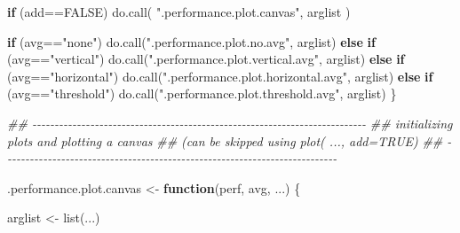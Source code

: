\documentclass[
  letterpaper,
  DIV=11,
  numbers=noendperiod]{scrartcl}
\newenvironment{Shaded}{\begin{snugshade}}{\end{snugshade}}
\newcommand{\ConstantTok}[1]{\textcolor[rgb]{0.56,0.35,0.01}{#1}}
\newcommand{\ControlFlowTok}[1]{\textcolor[rgb]{0.00,0.23,0.31}{\textbf{#1}}}
\newcommand{\DocumentationTok}[1]{\textcolor[rgb]{0.37,0.37,0.37}{\textit{#1}}}
\newcommand{\FunctionTok}[1]{\textcolor[rgb]{0.28,0.35,0.67}{#1}}
\newcommand{\NormalTok}[1]{\textcolor[rgb]{0.00,0.23,0.31}{#1}}
\newcommand{\OtherTok}[1]{\textcolor[rgb]{0.00,0.23,0.31}{#1}}
\newcommand{\SpecialCharTok}[1]{\textcolor[rgb]{0.37,0.37,0.37}{#1}}
\newcommand{\StringTok}[1]{\textcolor[rgb]{0.13,0.47,0.30}{#1}}
\begin{document}
\begin{Shaded}
\begin{Highlighting}[]
      \ControlFlowTok{if}\NormalTok{ (add}\SpecialCharTok{==}\ConstantTok{FALSE}\NormalTok{) }\FunctionTok{do.call}\NormalTok{( }\StringTok{".performance.plot.canvas"}\NormalTok{, arglist )}

      \ControlFlowTok{if}\NormalTok{ (avg}\SpecialCharTok{==}\StringTok{"none"}\NormalTok{) }\FunctionTok{do.call}\NormalTok{(}\StringTok{".performance.plot.no.avg"}\NormalTok{, arglist)  }
      \ControlFlowTok{else} \ControlFlowTok{if}\NormalTok{ (avg}\SpecialCharTok{==}\StringTok{"vertical"}\NormalTok{)}
        \FunctionTok{do.call}\NormalTok{(}\StringTok{".performance.plot.vertical.avg"}\NormalTok{, arglist)}
      \ControlFlowTok{else} \ControlFlowTok{if}\NormalTok{ (avg}\SpecialCharTok{==}\StringTok{"horizontal"}\NormalTok{)}
        \FunctionTok{do.call}\NormalTok{(}\StringTok{".performance.plot.horizontal.avg"}\NormalTok{, arglist)}
      \ControlFlowTok{else} \ControlFlowTok{if}\NormalTok{ (avg}\SpecialCharTok{==}\StringTok{"threshold"}\NormalTok{)}
        \FunctionTok{do.call}\NormalTok{(}\StringTok{".performance.plot.threshold.avg"}\NormalTok{, arglist)}
\NormalTok{  \}}

\DocumentationTok{\#\# {-}{-}{-}{-}{-}{-}{-}{-}{-}{-}{-}{-}{-}{-}{-}{-}{-}{-}{-}{-}{-}{-}{-}{-}{-}{-}{-}{-}{-}{-}{-}{-}{-}{-}{-}{-}{-}{-}{-}{-}{-}{-}{-}{-}{-}{-}{-}{-}{-}{-}{-}{-}{-}{-}{-}{-}{-}{-}{-}{-}{-}{-}{-}{-}{-}{-}{-}{-}{-}{-}{-}{-}{-}{-}{-}}
\DocumentationTok{\#\# initializing plots and plotting a canvas}
\DocumentationTok{\#\# (can be skipped using \textquotesingle{}plot( ..., add=TRUE)\textquotesingle{}}
\DocumentationTok{\#\# {-}{-}{-}{-}{-}{-}{-}{-}{-}{-}{-}{-}{-}{-}{-}{-}{-}{-}{-}{-}{-}{-}{-}{-}{-}{-}{-}{-}{-}{-}{-}{-}{-}{-}{-}{-}{-}{-}{-}{-}{-}{-}{-}{-}{-}{-}{-}{-}{-}{-}{-}{-}{-}{-}{-}{-}{-}{-}{-}{-}{-}{-}{-}{-}{-}{-}{-}{-}{-}{-}{-}{-}{-}{-}{-}}

\NormalTok{.performance.plot.canvas }\OtherTok{\textless{}{-}} \ControlFlowTok{function}\NormalTok{(perf, avg, ...) \{}

\NormalTok{    arglist }\OtherTok{\textless{}{-}} \FunctionTok{list}\NormalTok{(...)}


\end{Highlighting}
\end{Shaded}
\end{document}
